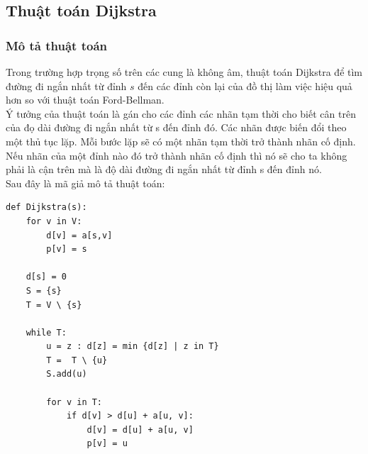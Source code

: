 \documentclass[a4paper,12pt]{report}
\begin{document}

\subsection{Thuật toán Dijkstra}
    \subsubsection{Mô tả thuật toán}
	Trong trường hợp trọng số trên các cung là không âm, thuật toán Dijkstra để tìm đường đi ngắn nhất từ đỉnh $ s $ đến các đỉnh còn lại của đồ thị làm việc hiệu quả hơn so với thuật toán Ford-Bellman.\\
	Ý tưởng của thuật toán là gán cho các đỉnh các nhãn tạm thời cho biết cân trên của đọ dài đường đi ngắn nhất từ s đến đỉnh đó. Các nhãn được biến đổi theo một thủ tục lặp. Mỗi bước lặp sẽ có một nhãn tạm thời trở thành nhãn cố định. Nếu nhãn của một đỉnh nào đó trở thành nhãn cố định thì nó sẽ cho ta không phải là cận trên mà là độ dài đường đi ngắn nhất từ đỉnh s đến đỉnh nó.\\
	Sau đây là mã giả mô tả thuật toán:\\
\begin{verbatim}		
def Dijkstra(s):
    for v in V:
        d[v] = a[s,v]
        p[v] = s
    
    d[s] = 0
    S = {s}
    T = V \ {s}
   
    while T:
        u = z : d[z] = min {d[z] | z in T}
        T =  T \ {u}
        S.add(u)
	
        for v in T:
            if d[v] > d[u] + a[u, v]:
	            d[v] = d[u] + a[u, v]
                p[v] = u
\end{verbatim}
\end{document}
